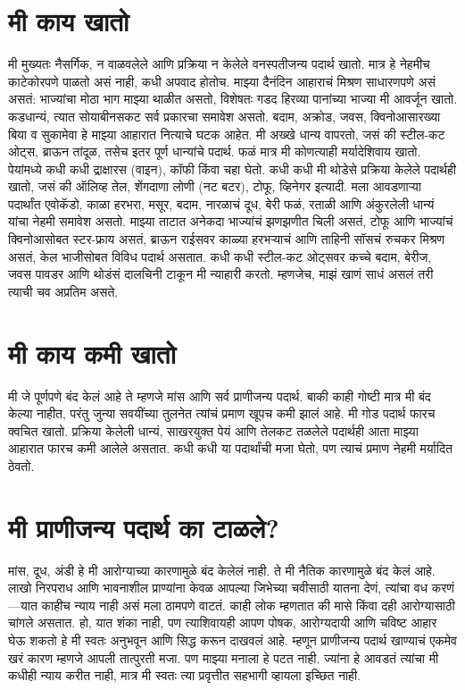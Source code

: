 \section*{मी काय खातो}
मी मुख्यतः नैसर्गिक, न वाळवलेले आणि प्रक्रिया न केलेले वनस्पतीजन्य पदार्थ खातो. मात्र हे नेहमीच काटेकोरपणे पाळतो असं नाही, कधी अपवाद होतोच. माझ्या दैनंदिन आहाराचं मिश्रण साधारणपणे असं असतं:
भाज्यांचा मोठा भाग माझ्या थाळीत असतो, विशेषतः गडद हिरव्या पानांच्या भाज्या मी आवर्जून खातो. कडधान्यं, त्यात सोयाबीनसकट सर्व प्रकारचा समावेश असतो. बदाम, अक्रोड, जवस, क्विनोआसारख्या बिया व सुकामेवा हे माझ्या आहारात नित्याचे घटक आहेत. मी अख्खे धान्य वापरतो, जसं की स्टील-कट ओट्स, ब्राऊन तांदूळ, तसेच इतर पूर्ण धान्यांचे पदार्थ. फळं मात्र मी कोणत्याही मर्यादेशिवाय खातो. पेयांमध्ये कधी कधी द्राक्षारस (वाइन), कॉफी किंवा चहा घेतो.
कधी कधी मी थोडेसे प्रक्रिया केलेले पदार्थही खातो, जसं की ऑलिव्ह तेल, शेंगदाणा लोणी (नट बटर), टोफू, व्हिनेगर इत्यादी. मला आवडणाऱ्या पदार्थांत एवोकॅडो, काळा हरभरा, मसूर, बदाम, नारळाचं दूध, बेरी फळं, रताळी आणि अंकुरलेली धान्यं यांचा नेहमी समावेश असतो.
माझ्या ताटात अनेकदा भाज्यांचं झणझणीत चिली असतं, टोफू आणि भाज्यांचं क्विनोआसोबत स्टर-फ्राय असतं, ब्राऊन राईसवर काळ्या हरभऱ्याचं आणि ताहिनी सॉसचं रुचकर मिश्रण असतं, केल भाजीसोबत विविध पदार्थ असतात. कधी कधी स्टील-कट ओट्सवर कच्चे बदाम, बेरीज, जवस पावडर आणि थोडंसं दालचिनी टाकून मी न्याहारी करतो. म्हणजेच, माझं खाणं साधं असलं तरी त्याची चव अप्रतिम असते.
\section*{मी काय कमी खातो}
मी जे पूर्णपणे बंद केलं आहे ते म्हणजे मांस आणि सर्व प्राणीजन्य पदार्थ. बाकी काही गोष्टी मात्र मी बंद केल्या नाहीत, परंतु जुन्या सवयींच्या तुलनेत त्यांचं प्रमाण खूपच कमी झालं आहे.
मी गोड पदार्थ फारच क्वचित खातो. प्रक्रिया केलेली धान्यं, साखरयुक्त पेयं आणि तेलकट तळलेले पदार्थही आता माझ्या आहारात फारच कमी आलेले असतात. कधी कधी या पदार्थांची मजा घेतो, पण त्याचं प्रमाण नेहमी मर्यादित ठेवतो.
\section*{मी प्राणीजन्य पदार्थ का टाळले?}
मांस, दूध, अंडी हे मी आरोग्याच्या कारणामुळे बंद केलेलं नाही. ते मी नैतिक कारणामुळे बंद केलं आहे. लाखो निरपराध आणि भावनाशील प्राण्यांना केवळ आपल्या जिभेच्या चवीसाठी यातना देणं, त्यांचा वध करणं—यात काहीच न्याय नाही असं मला ठामपणे वाटतं.
काही लोक म्हणतात की मासे किंवा दही आरोग्यासाठी चांगले असतात. हो, यात शंका नाही, पण त्याशिवायही आपण पोषक, आरोग्यदायी आणि चविष्ट आहार घेऊ शकतो हे मी स्वतः अनुभवून आणि सिद्ध करून दाखवलं आहे.
म्हणून प्राणीजन्य पदार्थ खाण्याचं एकमेव खरं कारण म्हणजे आपली तात्पुरती मजा. पण माझ्या मनाला हे पटत नाही. ज्यांना हे आवडतं त्यांचा मी कधीही न्याय करीत नाही, मात्र मी स्वतः त्या प्रवृत्तीत सहभागी व्हायला इच्छित नाही.
